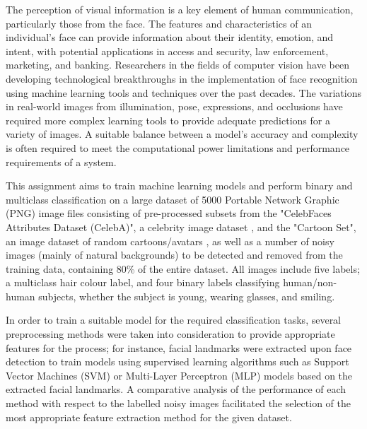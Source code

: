 \documentclass[conference]{IEEEtran}
\begin{document}
The perception of visual information is a key element of human communication, particularly those from the face. The features and characteristics of an individual's face can provide information about their identity, emotion, and intent, with potential applications in access and security, law enforcement, marketing, and banking. Researchers in the fields of computer vision have been developing technological breakthroughs %
in the implementation of face recognition using machine learning tools and techniques over the past decades.
The variations in real-world images from illumination, pose, expressions, and occlusions have required more complex learning tools to provide adequate predictions for a variety of images. A suitable balance between a model's accuracy and complexity is often required to meet the computational power limitations and performance requirements of a system.


This assignment aims to train machine learning models and perform binary and multiclass classification on a large dataset of 5000 Portable Network Graphic (PNG) image files consisting of pre-processed subsets from the "CelebFaces Attributes Dataset (CelebA)", a celebrity image dataset \cite{Yang2015} , and the "Cartoon Set", an image dataset of random cartoons/avatars \cite{Cole}, as well as a number of noisy images (mainly of natural backgrounds) to be detected and removed from the training data, containing 80\% of the entire dataset.
All images include five labels; a multiclass hair colour label, and four binary labels classifying human/non-human subjects, whether the subject is young, wearing glasses, and smiling.

In order to train a suitable model for the required classification tasks, several preprocessing methods were taken into consideration to provide appropriate features for the process; for instance, facial landmarks were extracted upon face detection to train models using supervised learning algorithms such as Support Vector Machines (SVM) or  Multi-Layer Perceptron (MLP) models based on the extracted facial landmarks.
A comparative analysis of the performance of each method with respect to the labelled noisy images facilitated the selection of the most appropriate feature extraction method for the given dataset.
\end{document}
